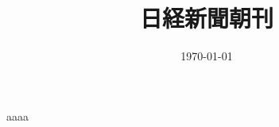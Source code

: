 \documentclass{ltjsarticle}
\title{日経新聞朝刊}
\author{}
\date{\today}
\begin{document}
\maketitle


aaaa
\end{document}
